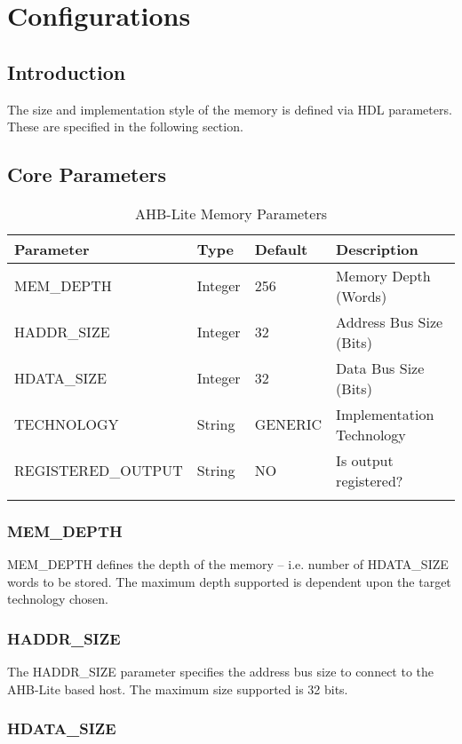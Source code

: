 \chapter{Configurations}\label{configurations}

\section{Introduction}\label{introduction-1}

The size and implementation style of the memory is defined via HDL parameters. These are specified in the following section.

\section{Core Parameters}\label{core-parameters}

\begin{longtable}[]{@{}llll@{}}
	\toprule
	Parameter & Type & Default & Description\tabularnewline
	\midrule
	\endhead
	MEM\_DEPTH & Integer & 256 & Memory Depth (Words)\tabularnewline
	HADDR\_SIZE & Integer & 32 & Address Bus Size (Bits)\tabularnewline
	HDATA\_SIZE & Integer & 32 & Data Bus Size (Bits)\tabularnewline
	TECHNOLOGY & String & GENERIC & Implementation Technology\tabularnewline
	REGISTERED\_OUTPUT & String & NO & Is output registered?\tabularnewline
	\bottomrule
	\caption{AHB-Lite Memory Parameters}
\end{longtable}


 \subsection{MEM\_DEPTH}\label{mem_depth}

MEM\_DEPTH defines the depth of the memory -- i.e. number of HDATA\_SIZE
words to be stored. The maximum depth supported is dependent upon the
target technology chosen.

 \subsection{HADDR\_SIZE}\label{haddr_size}

The HADDR\_SIZE parameter specifies the address bus size to connect 
to the AHB-Lite based host. The maximum size supported is 32 bits.

 \subsection{HDATA\_SIZE}\label{hdata_size}

